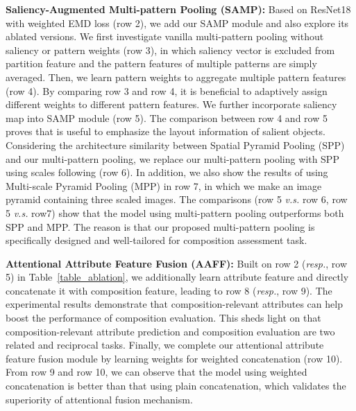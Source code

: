 \documentclass{bmvc2k}
\begin{document}
\noindent\textbf{Saliency-Augmented Multi-pattern Pooling (SAMP):} Based on ResNet18 with weighted EMD loss (row 2), we add our SAMP module and also explore its ablated versions. 
We first investigate vanilla multi-pattern pooling without saliency or pattern weights (row 3), in which saliency vector is excluded from partition feature and the pattern features of multiple patterns are simply averaged. 
Then, we learn pattern weights to aggregate multiple pattern features (row 4). By comparing row 3 and row 4,  it is beneficial to adaptively assign different weights to different pattern features. 
We further incorporate saliency map into SAMP module (row 5). The comparison between row 4 and row 5 proves that is useful to emphasize the layout information of salient objects.
Considering the architecture similarity between Spatial Pyramid Pooling (SPP) \cite{He2015SpatialPP} and our multi-pattern pooling, we replace our multi-pattern pooling with SPP using scales  following \cite{Chen2020AdaptiveFD} (row 6).
\textcolor[rgb]{0,0,0}{In addition, we also show the results of using Multi-scale Pyramid Pooling (MPP) \cite{yoo2015multi} in row 7, in which we make an image pyramid containing three scaled images. The comparisons (row 5 \emph{v.s.} row 6, row 5 \emph{v.s.} row7) show that the model using multi-pattern pooling outperforms both SPP and MPP.}
The reason is that our proposed multi-pattern pooling is specifically designed and well-tailored for composition assessment task.


\noindent\textbf{Attentional Attribute Feature Fusion (AAFF):} Built on row 2 (\emph{resp.}, row 5) in Table~\ref{table_ablation}, we additionally learn attribute feature and directly concatenate it with composition feature, leading to  row 8 (\emph{resp.}, row 9). The experimental results demonstrate that composition-relevant attributes can help boost the performance of composition evaluation. This sheds light on that composition-relevant attribute prediction and composition evaluation are two related and reciprocal tasks. 
Finally, we complete our attentional attribute feature fusion module by learning weights for weighted concatenation (row 10). 
From row 9 and row 10, we can observe that the model using weighted concatenation is better than that using plain concatenation, which validates the superiority of attentional fusion mechanism.
\end{document}
